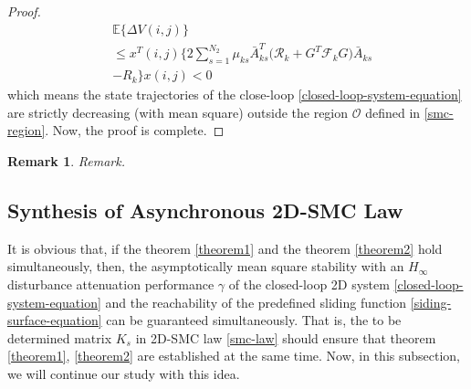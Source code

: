 \documentclass[conference]{IEEEtran}
\newtheorem{remark}{Remark}
\begin{document}
\begin{proof}
\begin{equation}
		\begin{split}
			&\mathbb{E}\{\varDelta V(i,j) \}\\
			&\leq x^{T}(i,j)\Big\{ 2\sum_{s=1}^{N_{2}}\mu_{ks}\bar{A}^{T}_{ks}\big(\mathcal{R}_{k} +G^{T}\mathcal{F}_{k}G \big)\bar{A}_{ks}\\ &-R_{k} \Big\} x(i,j)<0
		\end{split}
	\end{equation}
	which means the state trajectories of the close-loop \eqref{closed-loop-system-equation} are strictly decreasing (with mean square) outside the region $\mathcal{O}$ defined in \eqref{smc-region}. Now, the proof is complete.
	 
\end{proof}

\begin{remark}
	Remark.
\end{remark}


 
\subsection{  Synthesis of Asynchronous 2D-SMC Law }\label{smc-law-synthesis} 
It is obvious that, if the theorem \ref{theorem1} and the theorem \ref{theorem2} hold simultaneously, then, the asymptotically mean square stability  with an $H_{\infty}$ disturbance attenuation performance $\gamma$ of the closed-loop 2D system \eqref{closed-loop-system-equation} and the reachability of the predefined sliding function \eqref{siding-surface-equation} can be guaranteed simultaneously. That is, the to be determined matrix $K_{s}$ in 2D-SMC law \eqref{smc-law} should ensure that theorem \ref{theorem1}, \ref{theorem2} are established at the same time. Now, in this subsection, we will continue our study with this idea.
\end{document}
